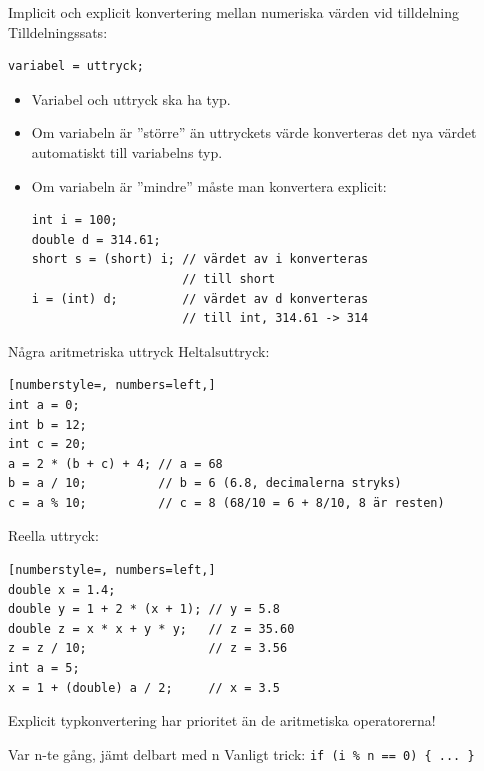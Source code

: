 \documentclass{lecturenotes}
\begin{document}
\begin{Slide}{Implicit och explicit konvertering mellan numeriska värden vid tilldelning}
Tilldelningssats:
\begin{lstlisting}
variabel = uttryck;
\end{lstlisting}
\begin{itemize}
\item Variabel och uttryck ska ha  typ.
\item Om variabeln är ''större'' än uttryckets värde konverteras det nya värdet automatiskt till variabelns typ.
\item Om variabeln är ''mindre'' måste man konvertera explicit:
\begin{lstlisting}
int i = 100;
double d = 314.61;
short s = (short) i; // värdet av i konverteras  
                     // till short
i = (int) d;         // värdet av d konverteras 
                     // till int, 314.61 -> 314
\end{lstlisting}
\end{itemize}
\end{Slide}


\begin{Slide}{Några aritmetriska uttryck}
Heltalsuttryck:
\begin{lstlisting}[numberstyle=, numbers=left,]
int a = 0;
int b = 12;
int c = 20;
a = 2 * (b + c) + 4; // a = 68
b = a / 10;          // b = 6 (6.8, decimalerna stryks)
c = a % 10;          // c = 8 (68/10 = 6 + 8/10, 8 är resten)
\end{lstlisting}

Reella uttryck:
\begin{lstlisting}[numberstyle=, numbers=left,]
double x = 1.4;
double y = 1 + 2 * (x + 1); // y = 5.8
double z = x * x + y * y;   // z = 35.60
z = z / 10;                 // z = 3.56
int a = 5;
x = 1 + (double) a / 2;     // x = 3.5
\end{lstlisting}
\footnotesize Explicit typkonvertering har  prioritet än de aritmetiska operatorerna!
\end{Slide}


\begin{Slide}{Var n-te gång, jämt delbart med n}
Vanligt trick: \lstinline+if (i % n == 0) { ... } +

\end{Slide}
\end{document}
